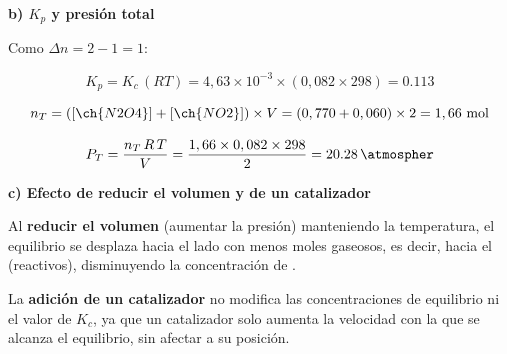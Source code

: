\begin{exerciseEVAU}
\begin{solu}
        \textbf{b) \(K_p\) y presión total}

        Como \(\Delta n = 2-1=1\):

        \begin{equation*}
            K_p = K_c\, (RT) = 4,63 \times 10^{-3} \times (0,082 \times 298) = \num{0.113}
        \end{equation*}

        \begin{equation*}
            n_T = ([\ch{N2O4}]+[\ch{NO2}]) \times V = (0,770+0,060) \times 2 = 1,66 \ \text{mol}
        \end{equation*}

        \begin{equation*}
            P_T = \dfrac{n_T\, R\, T}{V} = \dfrac{1,66 \times 0,082 \times 298}{2} = \SI{20.28}{\atmospher}
        \end{equation*}

        \textbf{c) Efecto de reducir el volumen y de un catalizador}

        Al \textbf{reducir el volumen} (aumentar la presión) manteniendo la temperatura, el equilibrio se desplaza hacia el lado con menos moles gaseosos, es decir, hacia el  (reactivos), disminuyendo la concentración de .

        La \textbf{adición de un catalizador} no modifica las concentraciones de equilibrio ni el valor de \(K_c\), ya que un catalizador solo aumenta la velocidad con la que se alcanza el equilibrio, sin afectar a su posición.

    \end{solu}

\end{exerciseEVAU}

